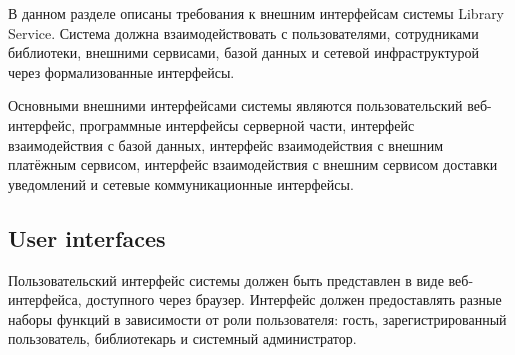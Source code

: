 \documentclass[12pt,a4paper]{article}
\begin{document}
	В данном разделе описаны требования к внешним интерфейсам системы Library
	Service. Система должна взаимодействовать с пользователями, сотрудниками
	библиотеки, внешними сервисами, базой данных и сетевой инфраструктурой через
	формализованные интерфейсы.
	
	Основными внешними интерфейсами системы являются пользовательский веб-интерфейс,
	программные интерфейсы серверной части, интерфейс взаимодействия с базой данных,
	интерфейс взаимодействия с внешним платёжным сервисом, интерфейс взаимодействия
	с внешним сервисом доставки уведомлений и сетевые коммуникационные интерфейсы.
	
	\subsection{User interfaces}
	
	Пользовательский интерфейс системы должен быть представлен в виде веб-интерфейса,
	доступного через браузер. Интерфейс должен предоставлять разные наборы функций
	в зависимости от роли пользователя: гость, зарегистрированный пользователь,
	библиотекарь и системный администратор.
	
\end{document}
